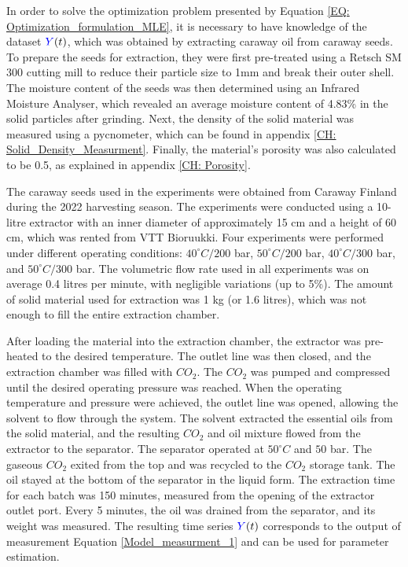 \documentclass[../Article_Model_Parameters.tex]{subfiles}
\begin{document}
	
	\label{CH: Experiments}
	
	In order to solve the optimization problem presented by Equation \ref{EQ: Optimization_formulation_MLE}, it is necessary to have knowledge of the dataset ${\color{blue}Y}(t)$, which was obtained by extracting caraway oil from caraway seeds. To prepare the seeds for extraction, they were first pre-treated using a Retsch SM 300 cutting mill to reduce their particle size to 1mm and break their outer shell. The moisture content of the seeds was then determined using an Infrared Moisture Analyser, which revealed an average moisture content of 4.83\% in the solid particles after grinding. Next, the density of the solid material was measured using a pycnometer, which can be found in appendix \ref{CH: Solid_Density_Measurment}. Finally, the material's porosity was also calculated to be 0.5, as explained in appendix \ref{CH: Porosity}.
	
	The caraway seeds used in the experiments were obtained from Caraway Finland during the 2022 harvesting season. The experiments were conducted using a 10-litre extractor with an inner diameter of approximately 15 cm and a height of 60 cm, which was rented from VTT Bioruukki. Four experiments were performed under different operating conditions: $40^\circ C / 200$ bar, $50^\circ C / 200$ bar, $40^\circ C / 300$ bar, and $50^\circ C / 300$ bar. The volumetric flow rate used in all experiments was on average 0.4 litres per minute, with negligible variations (up to 5\%). The amount of solid material used for extraction was 1 kg (or 1.6 litres), which was not enough to fill the entire extraction chamber.
	
	After loading the material into the extraction chamber, the extractor was pre-heated to the desired temperature. The outlet line was then closed, and the extraction chamber was filled with $CO_2$. The $CO_2$ was pumped and compressed until the desired operating pressure was reached. When the operating temperature and pressure were achieved, the outlet line was opened, allowing the solvent to flow through the system. The solvent extracted the essential oils from the solid material, and the resulting $CO_2$ and oil mixture flowed from the extractor to the separator. The separator operated at $50^\circ C$ and $50$ bar. The gaseous $CO_2$ exited from the top and was recycled to the $CO_2$ storage tank. The oil stayed at the bottom of the separator in the liquid form. The extraction time for each batch was 150 minutes, measured from the opening of the extractor outlet port. Every 5 minutes, the oil was drained from the separator, and its weight was measured. The resulting time series ${\color{blue}Y}(t)$ corresponds to the output of measurement Equation \ref{Model_measurment_1} and can be used for parameter estimation.
	

	
\end{document}
